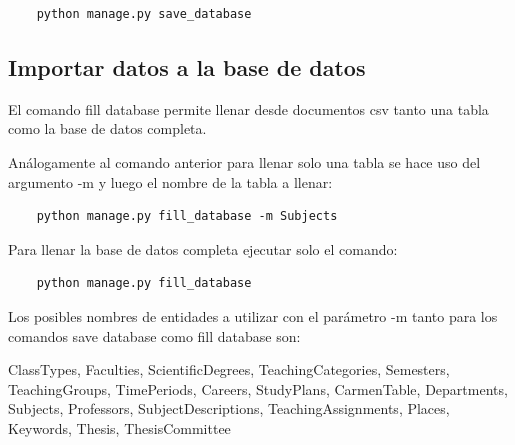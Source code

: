 \begin{verbatim}
    python manage.py save_database
\end{verbatim}


\subsection{Importar datos a la base de datos}
El comando fill database permite llenar desde 
documentos csv tanto una tabla como la base de 
datos completa.

Análogamente al comando anterior para llenar solo una tabla se hace uso del argumento -m y luego el nombre de la tabla a llenar:

\begin{verbatim}
    python manage.py fill_database -m Subjects
\end{verbatim}

Para llenar la base de datos completa ejecutar 
solo el comando:

\begin{verbatim}
    python manage.py fill_database
\end{verbatim}

Los posibles nombres de entidades a utilizar con
el parámetro -m tanto para los comandos 
save database como fill database son:

ClassTypes, Faculties,
ScientificDegrees, TeachingCategories,
Semesters, TeachingGroups, TimePeriods,
Careers, StudyPlans, CarmenTable, Departments,
Subjects, Professors, SubjectDescriptions, TeachingAssignments,
Places, Keywords, Thesis, ThesisCommittee




